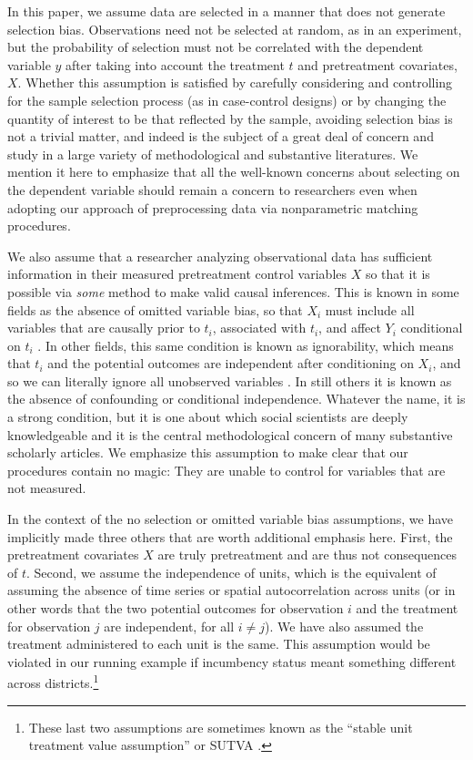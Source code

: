 \documentclass[11pt,titlepage]{article}
\begin{document}
In this paper, we assume data are selected in a manner that does not
generate selection bias.  Observations need not be selected at random,
as in an experiment, but the probability of selection must not be
correlated with the dependent variable $y$ after taking into account
the treatment $t$ and pretreatment covariates, $X$.  Whether this
assumption is satisfied by carefully considering and controlling for
the sample selection process (as in case-control designs) or by
changing the quantity of interest to be that reflected by the sample,
avoiding selection bias is not a trivial matter, and indeed is the
subject of a great deal of concern and study in a large variety of
methodological and substantive literatures.  We mention it here to
emphasize that all the well-known concerns about selecting on the
dependent variable should remain a concern to researchers even when
adopting our approach of preprocessing data via nonparametric matching
procedures.

We also assume that a researcher analyzing observational data has
sufficient information in their measured pretreatment control
variables $X$ so that it is possible via \emph{some} method to make
valid causal inferences.  This is known in some fields as the absence
of omitted variable bias, so that $X_i$ must include all variables
that are causally prior to $t_i$, associated with $t_i$, and affect
$Y_i$ conditional on $t_i$ \citep{Goldberger91,KinKeoVer94}.  In other
fields, this same condition is known as ignorability, which means that
$t_i$ and the potential outcomes are independent after conditioning on
$X_i$, and so we can literally ignore all unobserved variables
\citep{RosRub83}.  In still others it is known as the absence of
confounding or conditional independence.  Whatever the name, it is a
strong condition, but it is one about which social scientists are
deeply knowledgeable and it is the central methodological concern of
many substantive scholarly articles.  We emphasize this assumption to
make clear that our procedures contain no magic: They are unable to
control for variables that are not measured.

In the context of the no selection or omitted variable bias
assumptions, we have implicitly made three others that are worth
additional emphasis here.  First, the pretreatment covariates $X$ are
truly pretreatment and are thus not consequences of $t$.  Second, we
assume the independence of units, which is the equivalent of assuming
the absence of time series or spatial autocorrelation across units (or
in other words that the two potential outcomes for observation $i$ and
the treatment for observation $j$ are independent, for all $i\not=j$).
We have also assumed the treatment administered to each unit is the
same.  This assumption would be violated in our running example if
incumbency status meant something different across
districts.\footnote{These last two assumptions are sometimes known as
  the ``stable unit treatment value assumption'' or SUTVA
  \citep{Rubin74}.}
\end{document}
